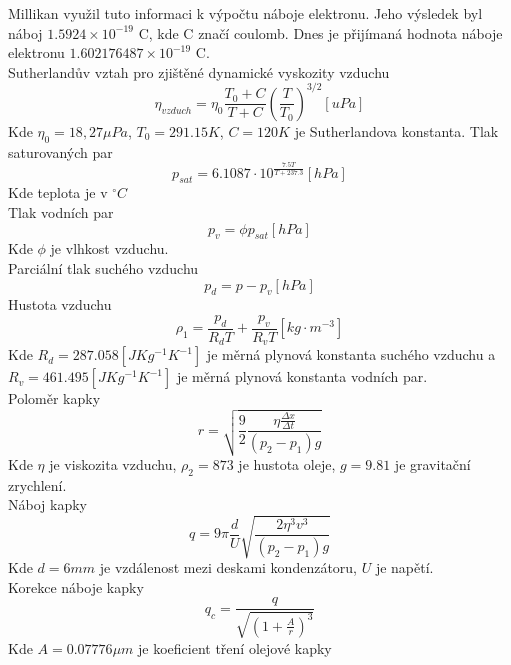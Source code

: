 \documentclass{article}
\begin{document}
Millikan využil tuto informaci k výpočtu náboje elektronu. Jeho výsledek byl náboj $1.5924 \times 10^{-19}$ C, kde C značí coulomb. Dnes je přijímaná hodnota náboje elektronu $1.602176487 \times 10^{-19}$ C.\\

Sutherlandův vztah pro zjištěné dynamické vyskozity vzduchu
\begin{equation}\label{eq:vis}
  \eta_{vzduch} = \eta_{0} \frac{T_{0} + C}{T + C} \left( \frac{T}{T_{0}} \right)^{3/2} [uPa]
\end{equation}
Kde $\eta_{0} = 18,27 \mu Pa$, $T_{0} = 291.15K$, $C = 120 K$ je Sutherlandova konstanta.
Tlak saturovaných par
\begin{equation}
  p_{sat} = 6.1087 \cdot 10^{\frac{7.5T}{T+237.3}} [hPa]
\end{equation}
Kde teplota je v $^{\circ}C$\\
Tlak vodních par
\begin{equation}
  p_{v} = \phi p_{sat} [hPa]
\end{equation}
Kde $\phi$ je vlhkost vzduchu.\\
Parciální tlak suchého vzduchu
\begin{equation}
  p_{d} = p - p_{v} [hPa]
\end{equation}
Hustota vzduchu
\begin{equation}\label{eq:p1}
  \rho_{1} = \frac{p_{d}}{R_{d}T} + \frac{p_{v}}{R_{v}T} [kg \cdot m^{-3}]
\end{equation}
Kde $R_{d} = 287.058 [J Kg^{-1} K^{-1}]$ je měrná plynová konstanta suchého vzduchu a
$R_{v} = 461.495[J Kg^{-1} K^{-1}]$ je měrná plynová konstanta vodních par.\\

Poloměr kapky
\begin{equation}\label{eq:r}
  r = \sqrt{\frac{9}{2} \frac{\eta \frac{\Delta x}{\Delta t}}{(p_{2} - p_{1})g}}
\end{equation}
Kde $\eta$ je viskozita vzduchu, $\rho_{2} = 873$ je hustota oleje, $g = 9.81$ je gravitační zrychlení.\\
Náboj kapky
\begin{equation}
  q = 9 \pi \frac{d}{U} \sqrt{\frac{2 \eta^{3} v^{3}}{(p_{2} - p_{1})g}}
\end{equation}
Kde $d = 6mm$ je vzdálenost mezi deskami kondenzátoru, $U$ je napětí.\\
Korekce náboje kapky
\begin{equation}\label{eq:cr}
  q_{c} = \frac{q}{\sqrt{ \left(1+\frac{A}{r} \right)^{3}}}
\end{equation}
Kde $A = 0.07776 \mu m$ je koeficient tření olejové kapky
\newpage
\end{document}

